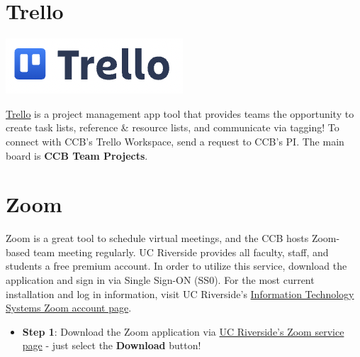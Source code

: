 \documentclass[
]{book}
\providecommand{\tightlist}{%
  \setlength{\itemsep}{0pt}\setlength{\parskip}{0pt}}
\begin{document}
\hypertarget{trello}{%
\section{Trello}\label{trello}}

\begin{flushleft}\includegraphics{images/trello} \end{flushleft}

\href{https://trello.com/en}{Trello} is a project management app tool that provides teams the opportunity to create task lists, reference \& resource lists, and communicate via tagging! To connect with CCB's Trello Workspace, send a request to CCB's PI. The main board is \textbf{CCB Team Projects}.

\hypertarget{zoom}{%
\section{Zoom}\label{zoom}}

Zoom is a great tool to schedule virtual meetings, and the CCB hosts Zoom-based team meeting regularly. UC Riverside provides all faculty, staff, and students a free premium account. In order to utilize this service, download the application and sign in via Single Sign-ON (SS0). For the most current installation and log in information, visit UC Riverside's \href{https://its.ucr.edu/blog/2019/12/17/changes-ucr-zoom-account-access}{Information Technology Systems Zoom account page}.

\begin{itemize}
\tightlist
\item
  \textbf{Step 1}: Download the Zoom application via \href{https://ucr.zoom.us/}{UC Riverside's Zoom service page} - just select the \textbf{Download} button!
\end{itemize}
\end{document}
